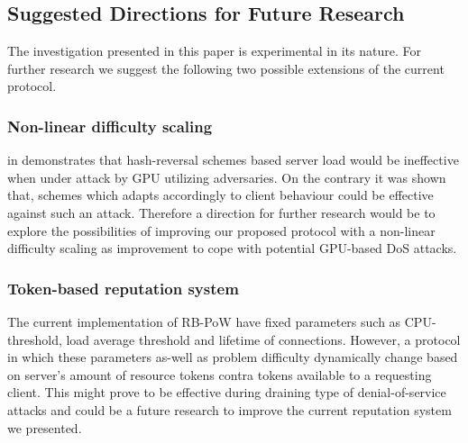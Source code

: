 \subsection{Suggested Directions for Future Research}
The investigation presented in this paper is experimental in its nature. For further research we suggest the following two possible extensions of the current protocol.

\subsubsection{Non-linear difficulty scaling}
 \citeauthor{Green} in  demonstrates that hash-reversal schemes based server load would be ineffective when under attack by GPU utilizing adversaries. On the contrary it was shown that, schemes which adapts accordingly to client behaviour could be effective against such an attack. Therefore a direction for further research would be to explore the possibilities of improving our proposed protocol with a non-linear difficulty scaling as improvement to cope with potential GPU-based DoS attacks. 

\subsubsection{Token-based reputation system}
The current implementation of RB-PoW have fixed parameters such as CPU-threshold, load average threshold and lifetime of connections. However, a protocol in which these parameters as-well as problem difficulty  dynamically change based on server's amount of resource tokens contra tokens available to a requesting client. This might prove to be effective during draining type of denial-of-service attacks and could be a future research to improve the current reputation system we presented.
 

